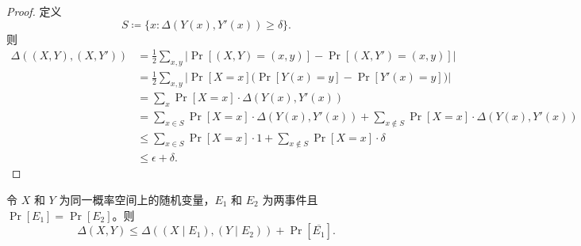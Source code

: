 \documentclass[american,singlepageview]{snargs-book-zh}
\newcommand{\DefineEqual}{\coloneqq}
\newcommand{\Event}{E}
\newcommand{\ConditionedOn}{\;\vert\;}
\newcommand{\RandomVariableX}{X}
\newcommand{\RandomVariableY}{Y}
\newcommand{\StatisticalDistanceSymbol}{\Delta}
\newcommand{\StatisticalDistance}[2]{\StatisticalDistanceSymbol\left(#1,#2\right)}
\newcommand{\Negate}[1]{\overline{#1}}
\newcommand{\AbsValue}[1]{\left|{#1}\right|}
\begin{document}
\begin{proof}
定义
\[
S \DefineEqual \{ x : \StatisticalDistance{\RandomVariableY(x)}{\RandomVariableY'(x)} \geq \delta \}.
\]
则
\begin{align*}
\StatisticalDistance{(\RandomVariableX,\RandomVariableY)}{(\RandomVariableX,\RandomVariableY')}
&=
\frac{1}{2} \sum_{x,y} \AbsValue{\Pr[(\RandomVariableX,\RandomVariableY)=(x,y)] - \Pr[(\RandomVariableX,\RandomVariableY')=(x,y)]}
\\ &=
\frac{1}{2} \sum_{x,y} \AbsValue{\Pr[\RandomVariableX=x]\bigl(\Pr[\RandomVariableY(x)=y]-\Pr[\RandomVariableY'(x)=y]\bigr)}
\\ &=
\sum_{x} \Pr[\RandomVariableX=x] \cdot \StatisticalDistance{\RandomVariableY(x)}{\RandomVariableY'(x)}
\\ &=
\sum_{x \in S} \Pr[\RandomVariableX=x] \cdot \StatisticalDistance{\RandomVariableY(x)}{\RandomVariableY'(x)}
+
\sum_{x \notin S} \Pr[\RandomVariableX=x] \cdot \StatisticalDistance{\RandomVariableY(x)}{\RandomVariableY'(x)}
\\ &\leq
\sum_{x \in S} \Pr[\RandomVariableX=x] \cdot 1
+
\sum_{x \notin S} \Pr[\RandomVariableX=x] \cdot \delta
\\ &\leq
\epsilon + \delta.
\end{align*}
\end{proof}

\begin{claim}
\label{claim:statistical-distance-condition-event}
令 $\RandomVariableX$ 和 $\RandomVariableY$ 为同一概率空间上的随机变量，$\Event_{1}$ 和 $\Event_{2}$ 为两事件且 $\Pr[\Event_{1}]=\Pr[\Event_{2}]$。则
\[
\StatisticalDistance{\RandomVariableX}{\RandomVariableY}
\leq
\StatisticalDistance{(\RandomVariableX \ConditionedOn \Event_{1})}{(\RandomVariableY \ConditionedOn \Event_{2})}
+ \Pr[\Negate{\Event_{1}}].
\]
\end{claim}
\end{document}
